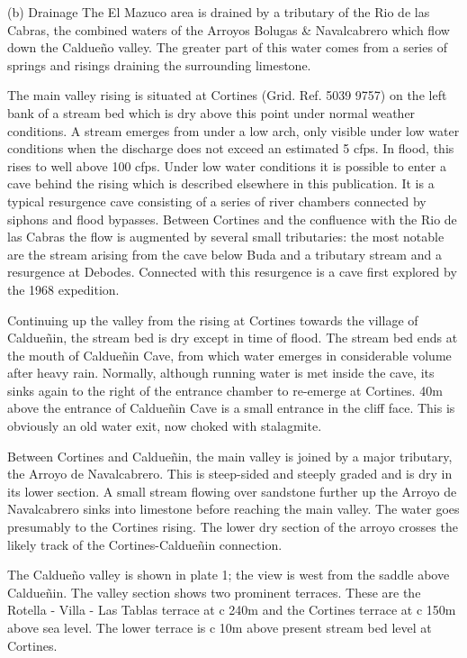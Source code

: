 \documentclass[11pt, a4paper, twoside]{memoir}
\begin{document}
(b) Drainage The El Mazuco area is drained by a tributary of the Rio de las Cabras, the combined waters of the Arroyos Bolugas \& Navalcabrero which flow down the Caldueño valley. The greater part of this water comes from a series of springs and risings draining the surrounding limestone.

The main valley rising is situated at Cortines (Grid. Ref. 5039 9757) on the left bank of a stream bed which is dry above this point under normal weather conditions. A stream emerges from under a low arch, only visible under low water conditions when the discharge does not exceed an estimated 5 cfps. In flood, this rises to well above 100 cfps. Under low water conditions it is possible to enter a cave behind the rising which is described elsewhere in this publication. It is a typical resurgence cave consisting of a series of river chambers connected by siphons and flood bypasses. Between Cortines and the confluence with the Rio de las Cabras the flow is augmented by several small tributaries: the most notable are the stream arising from the cave below Buda and a tributary stream and a resurgence at Debodes. Connected with this resurgence is a cave first explored by the 1968 expedition.

Continuing up the valley from the rising at Cortines towards the village of Caldueñin, the stream bed is dry except in time of flood. The stream bed ends at the mouth of Caldueñin Cave, from which water emerges in considerable volume after heavy rain. Normally, although running water is met inside the cave, its sinks again to the right of the entrance chamber to re-emerge at Cortines. 40m above the entrance of Caldueñin Cave is a small entrance in the cliff face. This is obviously an old water exit, now choked with stalagmite.

Between Cortines and Caldueñin, the main valley is joined by a major tributary, the Arroyo de Navalcabrero. This is steep-sided and steeply graded and is dry in its lower section. A small stream flowing over sandstone further up the Arroyo de Navalcabrero sinks into limestone before reaching the main valley. The water goes presumably to the Cortines rising. The lower dry section of the arroyo crosses the likely track of the Cortines-Caldueñin connection.

The Caldueño valley is shown in plate 1; the view is west from the saddle above Caldueñin. The valley section shows two prominent terraces. These are the Rotella - Villa - Las Tablas terrace at c 240m and the Cortines terrace at c 150m above sea level. The lower terrace is c 10m above present stream bed level at Cortines.
\end{document}

